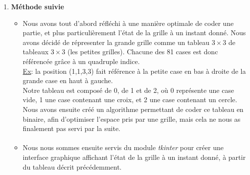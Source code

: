 \documentclass[10pt]{article}
\begin{document}
\begin{enumerate}
\item \textbf{Méthode suivie}

\begin{itemize}
    \item Nous avons tout d'abord réfléchi à une manière optimale de coder une partie, et plus particulièrement l'état de la grille à un instant donné. Nous avons décidé de répresenter  la grande grille comme un tableau $3\times3$ de tableaux $3\times3$ (les petites grilles). Chacune des 81 cases est donc référencée grâce à un quadruple indice. \\
    \underline{Ex}: la position (1,1,3,3) fait référence à la petite case en bas à droite de la grande case en haut à gauche. \\ 
    Notre tableau est composé de 0, de 1 et de 2, où 0 représente une case vide, 1 une case contenant une croix, et 2 une case contenant un cercle. \\
    Nous avons ensuite créé un algorithme permettant de coder ce tableau en binaire, afin d'optimiser l'espace pris par une grille, mais cela ne nous as finalement pas servi par la suite.
   \paragraph{}
    \item Nous nous sommes ensuite servis du module \textit{tkinter} pour créer une interface graphique affichant l'état de la grille à un instant donné, à partir du tableau décrit précédemment. 

\end{itemize}
\end{enumerate}
\end{document}
